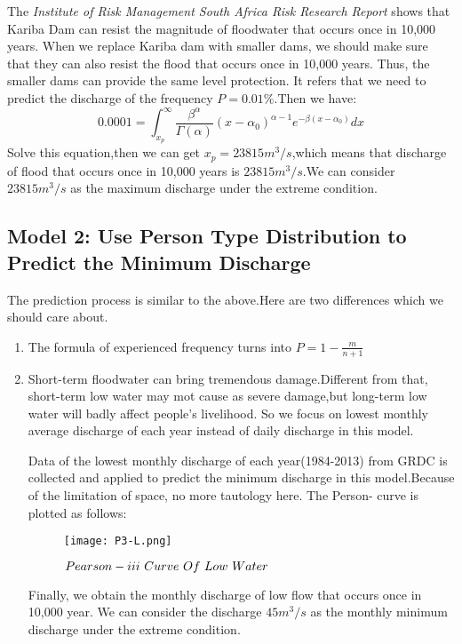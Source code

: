 \documentclass[12pt]{article}%
\begin{document}
\begin{enumerate}[1.]
	\par\noindent
The \emph{Institute of Risk Management South Africa Risk Research Report} shows that Kariba Dam can resist the magnitude of floodwater that occurs once in 10,000 years. When we replace Kariba dam with smaller dams, we should make sure that they can also resist the flood that occurs once in 10,000 years. Thus, the smaller dams can provide the same level protection. It refers that we need to predict the discharge of the frequency $P=0.01\%$.Then we have:
$$0.0001=\int_{x_{p}}^{\infty} \frac{\beta ^{\alpha}}{\Gamma (\alpha)}(x-\alpha_{0})^{\alpha -1} e^{-\beta (x-\alpha_{0})}dx	$$
Solve this equation,then we can get $x_{p}=23815m^3/s$,which means that discharge of flood that occurs once in 10,000 years is $23815m^3/s$.We can consider $23815m^3/s$ as the maximum discharge under the extreme condition.

\end{enumerate}

\subsection{Model 2: Use Person Type \uppercase\expandafter{} Distribution to Predict the Minimum Discharge}
The prediction process is similar to the above.Here are two differences which we should care about.
\begin{enumerate}[1.]
\item The formula of experienced frequency turns into $P=1-\frac{m}{n+1}$
\item Short-term floodwater can bring tremendous damage.Different from that, short-term low water may mot cause as severe damage,but long-term low water will badly affect people's livelihood. So we focus on lowest monthly average discharge of each year instead of daily discharge in this model.
	\par\noindent
  Data of the lowest monthly discharge of each year(1984-2013) from GRDC is collected and applied to predict the minimum discharge in this model.Because of the limitation of space, no more tautology here. The Person-\uppercase\expandafter{} curve is plotted as follows:
\begin{figure}[H]
	\centering
	\texttt{[image: P3-L.png]}
	\caption{$Pearson-\uppercase\expandafter{\romannumeral3}\ Curve\ Of\ Low \ Water$}
	\label{P3-L}
\end{figure}
Finally, we obtain the monthly discharge of low flow that occurs once in 10,000 year. We can consider the discharge $45m^3/s$ as the monthly minimum discharge under the extreme condition.
\end{enumerate}
\end{document}
